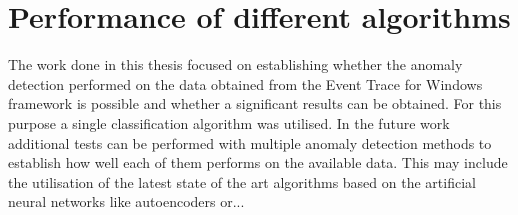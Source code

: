 \documentclass[a4paper,twoside,12pt]{book}
\newcounter{PagesWithoutNumbers}
\begin{document}
\section{Performance of different algorithms}

The work done in this thesis focused on establishing whether the anomaly detection performed on the
data obtained from the Event Trace for Windows framework is possible and whether a significant results
can be obtained. For this purpose a single classification algorithm was utilised. In the future work 
additional tests can be performed with multiple anomaly detection methods to establish how well each 
of them performs on the available data. This may include the utilisation of the latest state of the 
art algorithms based on the artificial neural networks like autoencoders or...






\backmatter
{}
\setcounter{page}{\value{PagesWithoutNumbers}}

\pagestyle{onlyPageNumbers}




\end{document}
